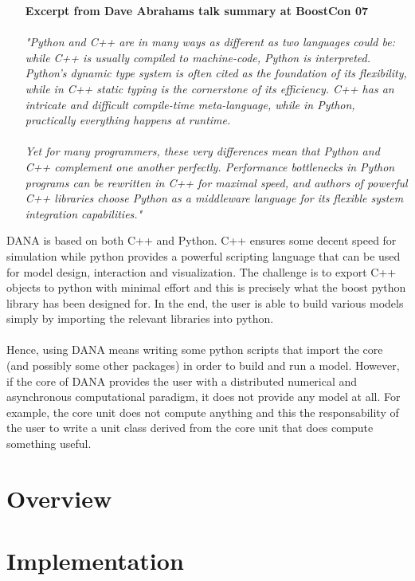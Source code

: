 
\begin{itemize}
\item [{\bf Excerpt from Dave Abrahams talk summary at BoostCon 07}\\
\\
]
{\em {\small "Python and C++ are in many ways as different as two languages could be:
     while C++ is usually compiled to machine-code, Python is interpreted.
     Python's dynamic type system is often cited as the foundation of its
     flexibility, while in C++ static typing is the cornerstone of its
     efficiency. C++ has an intricate and difficult compile-time meta-language,
     while in Python, practically everything happens at runtime.\\
     \\
     
     Yet for many programmers, these very differences mean that Python and C++
     complement one another perfectly. Performance bottlenecks in Python
     programs can be rewritten in C++ for maximal speed, and authors of
     powerful C++ libraries choose Python as a middleware language for its
     flexible system integration capabilities."}}
\end{itemize}

DANA is based on both C++ and Python. C++ ensures some decent speed for
simulation while python provides a powerful scripting language that can be used
for model design, interaction and visualization. The challenge is to export C++
objects to python with minimal effort and this is precisely what the boost
python library has been designed for. In the end, the user is able to build
various models simply by importing the relevant libraries into python.\\
\\

Hence, using DANA means writing some python scripts that import the core (and
possibly some other packages) in order to build and run a model. However, if
the core of DANA provides the user with a distributed numerical and
asynchronous computational paradigm, it does not provide any model at all. For
example, the core unit does not compute anything and this the responsability of
the user to write a unit class derived from the core unit that does compute
something useful.

\section{Overview}

\section{Implementation}

